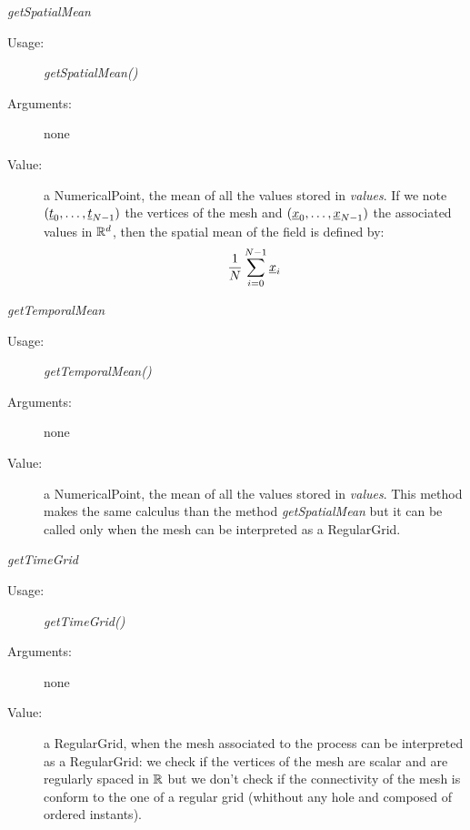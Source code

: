\begin{description}
\begin{description}
\item \textit{getSpatialMean}
\begin{description}
\item[Usage:] \textit{getSpatialMean()}
\item[Arguments:] none
\item[Value:] a NumericalPoint, the mean of all the values stored in \textit{values}. If we note $({\underline{t}}_0, \dots, {\underline{t}}_{N-1})$ the vertices of the mesh  and $({\underline{x}}_0, \dots, {\underline{x}}_{N-1})$ the associated values in ${\mathbb R}^d$, then the spatial mean of the field is  defined by:
\begin{align}\label{Field.getSpatialMean}
\displaystyle \frac{1}{N} \sum_{i=0}^{N-1} {\underline{x}}_i
\end{align}
\end{description}
\bigskip

\item \textit{getTemporalMean}
\begin{description}
\item[Usage:] \textit{getTemporalMean()}
\item[Arguments:] none
\item[Value:] a NumericalPoint, the mean of all the values stored in \textit{values}. This method makes the same calculus than the method {\itshape getSpatialMean} but it can be called only when the mesh can be interpreted as a RegularGrid.
\end{description}
\bigskip

\item \textit{getTimeGrid}
\begin{description}
\item[Usage:] \textit{getTimeGrid()}
\item[Arguments:]none
\item[Value:]  a RegularGrid, when the mesh associated to the process can be interpreted as a RegularGrid: we check if the vertices of the mesh are scalar and are regularly spaced in ${\mathbb R}$ but we don't check if the connectivity of the mesh is conform to the one of a regular grid (whithout any hole and composed of ordered instants).
\end{description}
\bigskip


\end{description}
\end{description}
